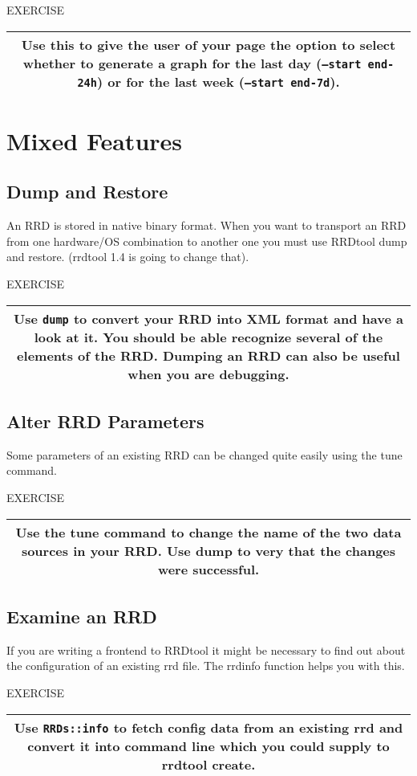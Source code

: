 \documentclass[a4paper,12pt]{article}
\newenvironment{work}{\textsf{\tiny EXERCISE}\nopagebreak\\[0.3ex]\begin{tabular}{|c|}
 \hline
 \begin{minipage}{0.965\linewidth}%
 \setlength{\parskip}{1.6ex plus 0.6ex minus 0.4ex}%
 \rule{0pt}{2.8ex}\ignorespaces}
{\rule[-1.8ex]{0pt}{0pt}\end{minipage}\\
 \hline
 \end{tabular}}
\newcommand{\ex}[1]{\subsection{#1}}
\newcommand{\cmd}[1]{\texttt{\mbox{#1}}}
\begin{document}
\begin{work}
Use this to give the user of your page the
option to select whether to generate a graph for the last day (\cmd{--start
end-24h}) or for the last week (\cmd{--start end-7d}).
\end{work}

\section{Mixed Features}
\ex{Dump and Restore} An RRD is stored in native binary format. When
you want to transport an RRD from one hardware/OS combination to
another one you must use RRDtool dump and restore. (rrdtool 1.4 is going to change that).

\begin{work}
Use \cmd{dump} to convert your RRD into XML format and have a look at
it. You should be able recognize several of the elements of the
RRD. Dumping an RRD can also be useful when you are debugging.
\end{work}

\ex{Alter RRD Parameters}
Some parameters of an existing RRD can be changed quite easily using
the tune command.

\begin{work}
Use the tune command to change the name of the two data sources in
your RRD. Use dump to very that the changes were successful.
\end{work}


\ex{Examine an RRD}

If you are writing a frontend to RRDtool it might be necessary to
find out about the configuration of an existing rrd file. The rrdinfo
function helps you with this.

\begin{work}
  Use \texttt{RRDs::info} to fetch config data from an existing rrd
  and convert it into command line which you could supply to rrdtool
  create.
\end{work}
\end{document}
